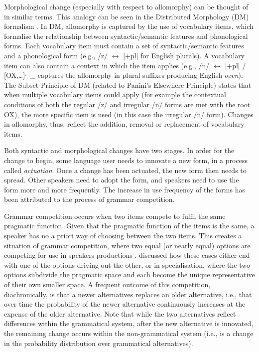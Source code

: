 	Morphological change (especially with respect to allomorphy) can be thought of in similar terms. This analogy can be seen in the Distributed Morphology (DM) formalism \citep{Halle.1993}. In DM, allomorphy is captured by the use of vocabulary items, which formalise the relationship between syntactic/semantic features and phonological forms. Each vocabulary item must contain a set of syntactic/semantic features and a phonological form (e.g., /z/ $\leftrightarrow$ [+pl] for English plurals). A vocabulary item can also contain a context in which the item applies (e.g., /n/ $\leftrightarrow$ [+pl] / [OX,\dots]$^{\smallfrown}$\_ captures the allomorphy in plural suffixes producing English \textit{oxen}). The Subset Principle of DM (related to Panini's Elsewhere Principle) states that when multiple vocabulary items could apply (for example the contextual conditions of both the regular /z/ and irregular /n/ forms are met with the root OX), the more specific item is used (in this case the irregular /n/ form). Changes in allomorphy, thus, reflect the addition, removal or replacement of vocabulary items.

	Both syntactic and morphological changes have two stages. In order for the change to begin, some language user needs to innovate a new form, in a process called \textit{actuation}. Once a change has been actuated, the new form then needs to spread. Other speakers need to adopt the form, and speakers need to use the form more and more frequently. The increase in use frequency of the forms has been attributed to the process of grammar competition.
	
	Grammar competition occurs when two items compete to fulfil the same pragmatic function. Given that the pragmatic function of the items is the same, a speaker has no a priori way of choosing between the two items. This creates a situation of grammar competition, where two equal (or nearly equal) options are competing for use in speakers productions \citep{Kroch.1989}. \cite{Wallenberg.2013} discussed how these cases either end with one of the options driving out the other, or in specialisation, where the two options subdivide the pragmatic space and each become the unique representative of their own smaller space. A frequent outcome of this competition, diachronically, is that a newer alternatives replaces an older alternative, i.e., that over time the probability of the newer alternative continuously increases at the expense of the older alternative. Note that while the two alternatives reflect differences within the grammatical system, after the new alternative is innovated, the remaining change occurs within the non-grammatical system (i.e., is a change in the probability distribution over grammatical alternatives).

